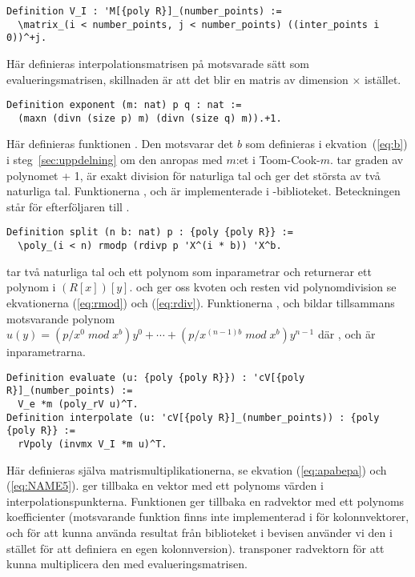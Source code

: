 \begin{lstlisting}
Definition V_I : 'M[{poly R}]_(number_points) :=
  \matrix_(i < number_points, j < number_points) ((inter_points i 0))^+j.
\end{lstlisting}

Här definieras interpolationsmatrisen på motsvarade sätt som
evalueringsmatrisen, skillnaden är att det blir en matris av dimension
 $\times$  istället.

\begin{lstlisting}
Definition exponent (m: nat) p q : nat :=
  (maxn (divn (size p) m) (divn (size q) m)).+1.
\end{lstlisting}
Här definieras funktionen . Den motsvarar det $b$ som definieras i
ekvation~(\ref{eq:b}) i steg~\ref{sec:uppdelning} om den anropas med $m$:et i
Toom-Cook-$m$.  tar graden av polynomet  + 1,  är exakt
division för naturliga tal och  ger det största av två naturliga tal.
Funktionerna ,  och  är implementerade i
\ssr{}-biblioteket. Beteckningen  står för efterföljaren till .

\begin{lstlisting}
Definition split (n b: nat) p : {poly {poly R}} :=
  \poly_(i < n) rmodp (rdivp p 'X^(i * b)) 'X^b.
\end{lstlisting}
 tar två naturliga tal och ett polynom som inparametrar och returnerar
ett polynom i $(R[x])[y]$.  och  ger oss kvoten och resten
vid polynomdivision se ekvationerna (\ref{eq:rmod}) och (\ref{eq:rdiv}).
Funktionerna ,  och  bildar tillsammans
motsvarande polynom
$u(y)=(p/x^0\;mod\;x^b)y^0+\cdots+(p/x^{(n-1)b}\;mod\;x^b)y^{n-1}$ där ,
 och  är inparametrarna.

\begin{lstlisting}
Definition evaluate (u: {poly {poly R}}) : 'cV[{poly R}]_(number_points) :=
  V_e *m (poly_rV u)^T.
Definition interpolate (u: 'cV[{poly R}]_(number_points)) : {poly {poly R}} :=
  rVpoly (invmx V_I *m u)^T.
\end{lstlisting}

Här definieras själva matrismultiplikationerna, se ekvation (\ref{eq:apabepa})
och (\ref{eq:NAME5}).  ger tillbaka en vektor med ett polynoms
värden i interpolationspunkterna. Funktionen  ger tillbaka en
radvektor med ett polynoms koefficienter (motsvarande funktion finns inte
implementerad i \ssr{} för kolonnvektorer, och för att kunna använda resultat
från biblioteket i bevisen använder vi den i stället för att definiera en egen
kolonnversion).  transponer radvektorn för att kunna multiplicera den med
evalueringsmatrisen.

